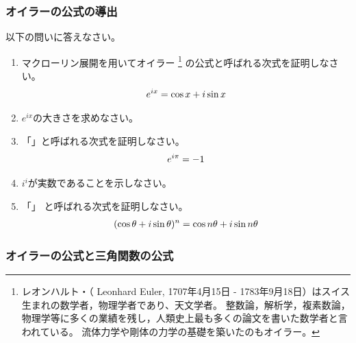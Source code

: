 \documentclass[twocolumn,11pt]{jarticle}
\begin{document}
\subsubsection{オイラーの公式の導出}
\nquestion 以下の問いに答えなさい。
\begin{enumerate}
\item マクローリン展開を用いてオイラー
\footnote{レオンハルト・（
Leonhard Euler,
1707年4月15日 - 1783年9月18日）はスイス生まれの数学者，物理学者であり、天文学者。
整数論，解析学，複素数論，物理学等に多くの業績を残し，人類史上最も多くの論文を書いた数学者と言われている。
流体力学や剛体の力学の基礎を築いたのもオイラー。
}
の公式と呼ばれる次式を証明しなさい。
  \begin{align}
    e^{ix}=\cos x + i \sin x \notag
  \end{align}
\item $e^{ix}$の大きさを求めなさい。
\item 「」と呼ばれる次式を証明しなさい。
  \begin{align}
    e^{i\pi}=-1 \notag
  \end{align}
\item $i^i$が実数であることを示しなさい。
\item 「」
と呼ばれる次式を証明しなさい。
  \begin{align}
    (\cos\theta+i\sin\theta)^n=\cos n\theta+i\sin n\theta\notag
  \end{align}
\end{enumerate}

\subsubsection{オイラーの公式と三角関数の公式}
\end{document}
